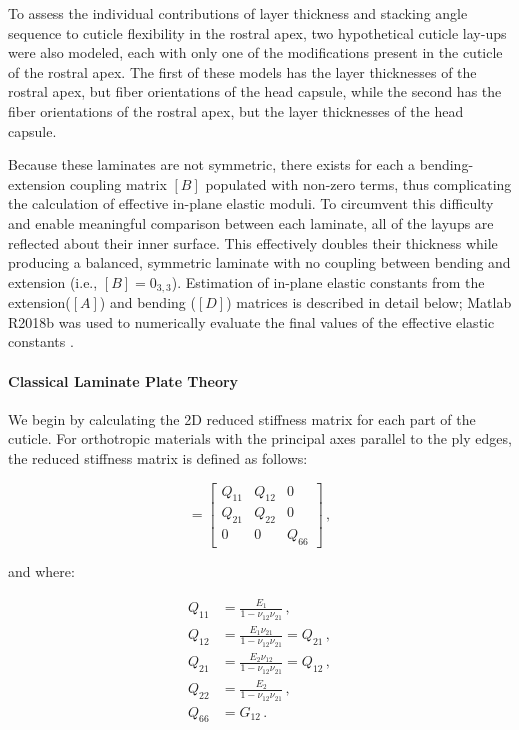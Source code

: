 \documentclass[twocolumn, linenumbers, superscriptaddress, nofootinbib]{revtex4-1}
\begin{document}
				To assess the individual contributions of layer thickness and stacking angle sequence to cuticle flexibility in the rostral apex, two hypothetical cuticle lay-ups were also modeled, each with only one of the modifications present in the cuticle of the rostral apex.
				The first of these models has the layer thicknesses of the rostral apex, but fiber orientations of the head capsule, while the second has the fiber orientations of the rostral apex, but the layer thicknesses of the head capsule.
				
				Because these laminates are not symmetric, there exists for each a bending-extension coupling matrix $[B]$ populated with non-zero terms, thus complicating the calculation of effective in-plane elastic moduli.
				To circumvent this difficulty and enable meaningful comparison between each laminate, all of the layups are reflected about their inner surface.
				This effectively doubles their thickness while producing a balanced, symmetric laminate with no coupling between bending and extension (i.e., $[B]=0_{3,3}$).
				Estimation of in-plane elastic constants from the extension($[A]$) and bending ($[D]$) matrices is described in detail below; Matlab R2018b was used to numerically evaluate the final values of the effective elastic constants \cite{Matlab}.
				
			\paragraph*{Classical Laminate Plate Theory}
				We begin by calculating the 2D reduced stiffness matrix for each part of the cuticle.
				For orthotropic materials with the principal axes parallel to the ply edges, the reduced stiffness matrix is defined as follows:
				
				\begin{equation}
				[Q] =
					\begin{bmatrix}
						Q_{11} & Q_{12} & 0 \\
						Q_{21} & Q_{22} & 0 \\
						0 & 0 & Q_{66}
					\end{bmatrix}\,,
				\end{equation}
				
				and where:
				
				\begin{equation}
				\begin{aligned}
					Q_{11} & = \frac{E_{1}}{1 - \nu_{12}\nu_{21}}\,, \\
					Q_{12} & = \frac{E_{1}\nu_{21}}{1 - \nu_{12}\nu_{21}} = Q_{21}\,, \\
					Q_{21} & = \frac{E_{2}\nu_{12}}{1 - \nu_{12}\nu_{21}} = Q_{12}\,, \\
					Q_{22} & = \frac{E_{2}}{1 - \nu_{12}\nu_{21}}\,, \\
					Q_{66} & = G_{12}\,.
				\end{aligned}
				\end{equation}
				
\end{document}
